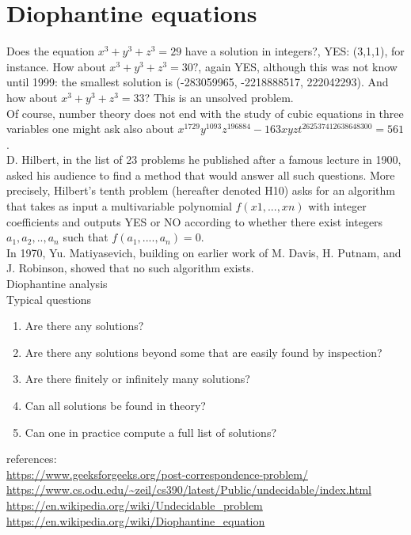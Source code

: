 \documentclass[
	12pt, %
]{fphw}
\begin{document}
\newpage
\section*{{\color{RoyalPurple}Diophantine equations}}

Does the equation $x^{3}+y^{3}+z^{3}=29$ have a solution in integers?, YES: (3,1,1), for instance. How about $x^{3}+y^{3}+z^{3}=30?$, again YES, although this was not know until 1999: the smallest solution is (-283059965, -2218888517, 222042293). And how about $x^{3}+y^{3}+z^{3}=33$? This is an unsolved problem.\\
Of course, number theory does not end with the study of cubic equations in three variables one might ask also about $x^{1729}y^{1093}z^{196884}-163xyzt^{262537412638648300}=561$.\\

D. Hilbert, in the list of 23 problems he published after a famous lecture in 1900, asked his audience to find a method that would answer all such questions. More precisely, Hilbert’s tenth problem (hereafter denoted H10) asks for an algorithm that takes as input a multivariable polynomial $f (x1, . . . , xn)$ with integer coefficients and outputs YES or NO according to whether there exist integers $a_{1},a_{2},..,a_{n}$ such that $f(a_{1},....,a_{n})=0$.\\

In 1970, Yu. Matiyasevich, building on earlier work of M. Davis, H. Putnam, and J. Robinson, showed that no such algorithm exists.\\

Diophantine analysis\\

Typical questions
\begin{enumerate}
\item Are there any solutions?
\item Are there any solutions beyond some that are easily found by inspection?
\item Are there finitely or infinitely many solutions?
\item Can all solutions be found in theory?
\item Can one in practice compute a full list of solutions?
\end{enumerate}



references:\\
\url{https://www.geeksforgeeks.org/post-correspondence-problem/}\\
\url{https://www.cs.odu.edu/~zeil/cs390/latest/Public/undecidable/index.html}\\
\url{https://en.wikipedia.org/wiki/Undecidable_problem}\\
\url{https://en.wikipedia.org/wiki/Diophantine_equation}\\
\end{document}
